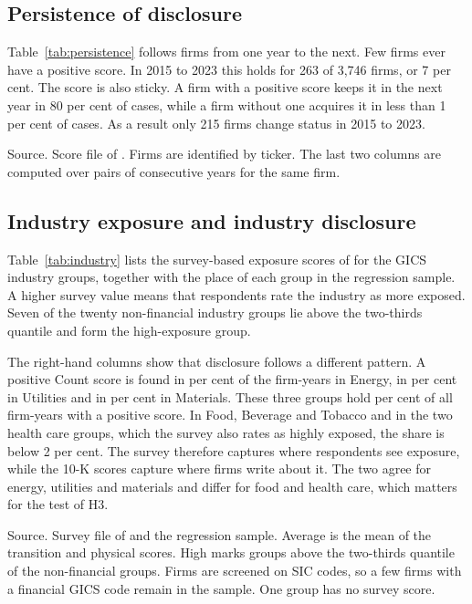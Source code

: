 \documentclass[12pt,a4paper]{article}
\newcommand{\tablenote}[1]{\par\smallskip\begin{minipage}{\linewidth}\footnotesize\setstretch{1.05}#1\end{minipage}}
\newcommand{\widetable}[1]{\resizebox{\ifdim\width>\linewidth\linewidth\else\width\fi}{!}{}}
\begin{document}
\subsection{Persistence of disclosure}

Table~\ref{tab:persistence} follows firms from one year to the next. Few firms ever have a positive score. In 2015 to 2023 this holds for 263 of 3,746 firms, or 7 per cent. The score is also sticky. A firm with a positive score keeps it in the next year in 80 per cent of cases, while a firm without one acquires it in less than 1 per cent of cases. As a result only 215 firms change status in 2015 to 2023.

\begin{table}[!htbp]
\centering\small
\caption{Persistence of the Count score}\label{tab:persistence}
\widetable{tables/tab_persistence}
\tablenote{Source. Score file of \citet{giglio2026}. Firms are identified by ticker. The last two columns are computed over pairs of consecutive years for the same firm.}
\end{table}

\subsection{Industry exposure and industry disclosure}

Table~\ref{tab:industry} lists the survey-based exposure scores of \citet{giglio2026} for the GICS industry groups, together with the place of each group in the regression sample. A higher survey value means that respondents rate the industry as more exposed. Seven of the twenty non-financial industry groups lie above the two-thirds quantile and form the high-exposure group.

The right-hand columns show that disclosure follows a different pattern. A positive Count score is found in \pctEnergy{} per cent of the firm-years in Energy, in \pctUtilities{} per cent in Utilities and in \pctMaterials{} per cent in Materials. These three groups hold \pctTopThree{} per cent of all firm-years with a positive score. In Food, Beverage and Tobacco and in the two health care groups, which the survey also rates as highly exposed, the share is below 2 per cent. The survey therefore captures where respondents see exposure, while the 10-K scores capture where firms write about it. The two agree for energy, utilities and materials and differ for food and health care, which matters for the test of H3.

\begin{table}[!htbp]
\centering\small
\caption{Survey-based exposure and disclosure by GICS industry group}\label{tab:industry}
\widetable{tables/tab_industry}
\tablenote{Source. Survey file of \citet{giglio2026} and the regression sample. Average is the mean of the transition and physical scores. High marks groups above the two-thirds quantile of the non-financial groups. Firms are screened on SIC codes, so a few firms with a financial GICS code remain in the sample. One group has no survey score.}
\end{table}
\end{document}
